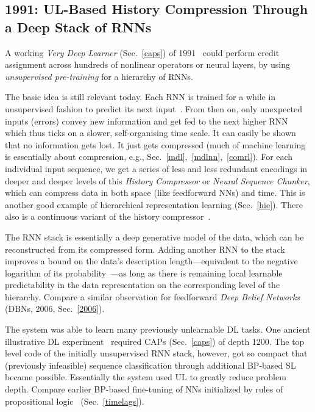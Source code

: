 \documentclass[letterpaper]{article}
\begin{document}
\begin{sloppypar}
\begin{itemize}
\end{itemize}


\subsection{1991: UL-Based History Compression Through a Deep Stack of RNNs}
\label{1991b}

A working {\em Very Deep Learner} (Sec.~\ref{caps}) of 1991~\citep{chunker91and92,mydeep2013}  could perform credit assignment across hundreds of nonlinear operators or neural layers, by using {\em unsupervised pre-training} for a hierarchy of RNNs.  


The basic idea is still relevant today. Each RNN is trained for a while in unsupervised fashion to predict its next input~\citep[e.g.,][]{connor1994,dorffner1996}. From then on, only unexpected inputs (errors) convey new information and get fed to the next higher RNN which thus ticks on a slower, self-organising time scale. It can easily be shown that no information gets lost. It just gets compressed (much of machine learning is 
essentially about compression, e.g., Sec.~\ref{mdl},~\ref{mdlnn},~\ref{comrl}). For each individual 
input sequence, we get a series of less and less redundant encodings in deeper and deeper levels of this 
{\em History Compressor} or {\em Neural Sequence Chunker}, which can compress data in both space (like feedforward NNs) and time. 
This is another good example of hierarchical representation learning (Sec.~\ref{hie}).
There also is a continuous 
variant of the history compressor~\citep{SchmidhuberMozerPrelinger:93}.

The RNN stack is essentially a deep generative model of the data, 
which can be reconstructed from its compressed form.
Adding another RNN to the stack improves a bound on the data's description length---equivalent to the negative logarithm of its probability~\citep{Huffman:52,Shannon:48}---as long as there is remaining local learnable predictability in the data 
representation on the corresponding level of the hierarchy.
Compare a similar observation for feedforward {\em Deep Belief Networks} (DBNs, 2006, Sec.~\ref{2006}). 

The system was able to learn many previously unlearnable DL tasks.
One ancient illustrative DL experiment~\citep{schmidhuber1993} required 
CAPs (Sec.~\ref{caps}) of depth 1200. 
The top level code of the initially unsupervised RNN stack, however, got so compact that (previously infeasible) sequence classification through additional BP-based SL became possible.
Essentially the system used UL to greatly reduce problem depth. 
Compare earlier BP-based fine-tuning of NNs initialized
by rules of propositional logic~\citep{shavlik1989} (Sec.~\ref{timelags}).


\end{sloppypar}
\end{document}

